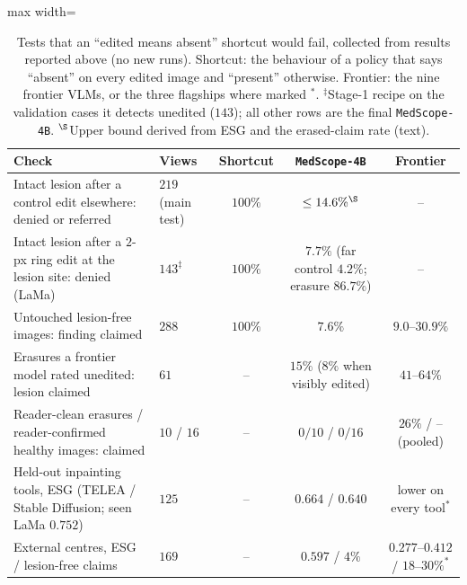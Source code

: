 \documentclass[5p,times,twocolumn,authoryear]{elsarticle}
\begin{document}
\begin{table}[!t]
\caption{Tests that an ``edited means absent'' shortcut would fail, collected from results reported above (no new runs). Shortcut: the behaviour of a policy that says ``absent'' on every edited image and ``present'' otherwise. Frontier: the nine frontier VLMs, or the three flagships where marked $^{\ast}$. $^{\ddagger}$Stage-1 recipe on the validation cases it detects unedited ($143$); all other rows are the final \texttt{MedScope-4B}. $^{\S}$Upper bound derived from ESG and the erased-claim rate (text).}
\label{tab:shortcut}
\vspace{-0.2cm}
\begin{center}
\small
\begin{adjustbox}{max width=\linewidth}
\begin{tabular}{llccc}
\toprule
\textbf{Check} & \textbf{Views} & \textbf{Shortcut} & \textbf{\texttt{MedScope-4B}} & \textbf{Frontier} \\
\midrule
Intact lesion after a control edit elsewhere: denied or referred & $219$ (main test) & $100\%$ & $\le 14.6\%^{\S}$ & -- \\
Intact lesion after a $2$-px ring edit at the lesion site: denied (LaMa) & $143^{\ddagger}$ & $100\%$ & $7.7\%$ (far control $4.2\%$; erasure $86.7\%$) & -- \\
Untouched lesion-free images: finding claimed & $288$ & $100\%$ & $7.6\%$ & $9.0$--$30.9\%$ \\
Erasures a frontier model rated unedited: lesion claimed & $61$ & -- & $15\%$ ($8\%$ when visibly edited) & $41$--$64\%$ \\
Reader-clean erasures / reader-confirmed healthy images: claimed & $10$ / $16$ & -- & $0/10$ / $0/16$ & $26\%$ / -- (pooled) \\
Held-out inpainting tools, ESG (TELEA / Stable Diffusion; seen LaMa $0.752$) & $125$ & -- & $0.664$ / $0.640$ & lower on every tool$^{\ast}$ \\
External centres, ESG / lesion-free claims & $169$ & -- & $0.597$ / $4\%$ & $0.277$--$0.412$ / $18$--$30\%^{\ast}$ \\
\bottomrule
\end{tabular}
\end{adjustbox}
\end{center}
\vspace{-0.2cm}
\end{table}
\end{document}
